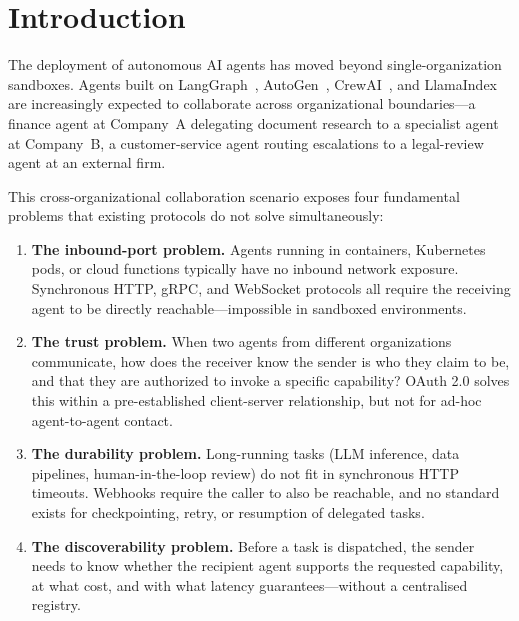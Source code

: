 \documentclass[11pt,a4paper]{article}
\begin{document}
\section{Introduction}
\label{sec:intro}

The deployment of autonomous AI agents has moved beyond single-organization sandboxes.
Agents built on LangGraph~\cite{langchain2024}, AutoGen~\cite{wu2023autogen},
CrewAI~\cite{crewai2024}, and LlamaIndex~\cite{llamaindex2024} are increasingly expected
to collaborate across organizational boundaries---a finance agent at Company~A
delegating document research to a specialist agent at Company~B, a customer-service
agent routing escalations to a legal-review agent at an external firm.

This cross-organizational collaboration scenario exposes four fundamental problems
that existing protocols do not solve simultaneously:

\begin{enumerate}[leftmargin=*]
  \item \textbf{The inbound-port problem.} Agents running in containers, Kubernetes
    pods, or cloud functions typically have no inbound network exposure. Synchronous
    HTTP, gRPC, and WebSocket protocols all require the receiving agent to be directly
    reachable---impossible in sandboxed environments.

  \item \textbf{The trust problem.} When two agents from different organizations
    communicate, how does the receiver know the sender is who they claim to be, and
    that they are authorized to invoke a specific capability? OAuth 2.0 solves this
    within a pre-established client-server relationship, but not for ad-hoc
    agent-to-agent contact.

  \item \textbf{The durability problem.} Long-running tasks (LLM inference, data
    pipelines, human-in-the-loop review) do not fit in synchronous HTTP timeouts.
    Webhooks require the caller to also be reachable, and no standard exists for
    checkpointing, retry, or resumption of delegated tasks.

  \item \textbf{The discoverability problem.} Before a task is dispatched, the sender
    needs to know whether the recipient agent supports the requested capability, at
    what cost, and with what latency guarantees---without a centralised registry.
\end{enumerate}
\end{document}
